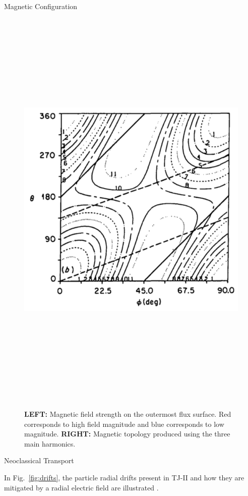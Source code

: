 \documentclass{beamer}
\newlength{\onecolwid}
\begin{document}
\begin{frame}[t]
\begin{columns}[t]
\begin{column}{\onecolwid}
\begin{block}{Magnetic Configuration}
\begin{figure}
{		\includegraphics[height=20cm]{../Graphics/Bcontours.png}
	}
	\caption{\textbf{LEFT:} Magnetic field strength on the outermost flux surface. Red corresponds to high field magnitude and blue corresponds to low magnitude. \textbf{RIGHT:} Magnetic topology produced using the three main harmonics.}
	\label{fig:magnetic_field}
\end{figure}

\end{block}

\begin{block}{Neoclassical Transport}

\hspace{32pt} In Fig.~\ref{fig:drifts}, the particle radial drifts present in TJ-II and how they are mitigated by a radial electric field are illustrated \cite{solano_study_1988}.


\end{block}
\end{column}
\end{columns}
\end{frame}
\end{document}
